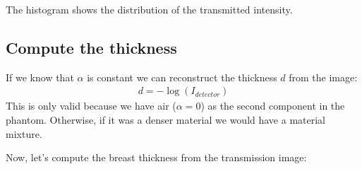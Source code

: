 \documentclass[letterpaper,10pt,english]{sphinxmanual}
\begin{document}
\noindent{}

\sphinxAtStartPar
The histogram shows the distribution of the transmitted intensity.


\subsection{Compute the thickness}
\label{\detokenize{04-BasicSegmentation:compute-the-thickness}}
\sphinxAtStartPar
If we know that \(\alpha\) is constant we can reconstruct the thickness \(d\) from the image:
\begin{equation*}
\begin{split} d = -\log(I_{detector})\end{split}
\end{equation*}
\sphinxAtStartPar
This is only valid because we have air (\(\alpha=0\)) as the second component in the phantom. Otherwise, if it was a denser material we would have a material mixture.

\sphinxAtStartPar
Now, let’s compute the breast thickness from the transmission image:

\begin{sphinxVerbatim}[commandchars=\\\{\}]
   
\end{sphinxVerbatim}

\begin{sphinxVerbatim}[commandchars=\\\{\}]
         

      

   
\end{sphinxVerbatim}
\end{document}
